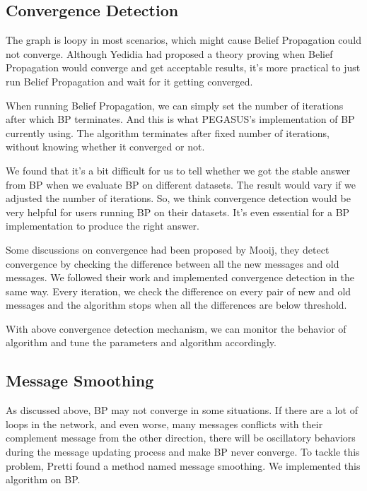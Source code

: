 \subsection{Convergence Detection}

The graph is loopy in most scenarios, which might cause Belief Propagation could not converge. Although Yedidia had proposed a theory proving when Belief Propagation would converge and get acceptable results, it’s more practical to just run Belief Propagation and wait for it getting converged.

When running Belief Propagation, we can simply set the number of iterations after which BP terminates. And this is what PEGASUS’s implementation of BP currently using. The algorithm terminates after fixed number of iterations, without knowing whether it converged or not.

We found that it’s a bit difficult for us to tell whether we got the stable answer from BP when we evaluate BP on different datasets. The result would vary if we adjusted the number of iterations. So, we think convergence detection would be very helpful for users running BP on their datasets. It’s even essential for a BP implementation to produce the right answer.

Some discussions on convergence had been proposed by Mooij\cite{Mooij05}, they detect convergence by checking the difference between all the new messages and old messages. We followed their work and implemented convergence detection in the same way. Every iteration, we check the difference on every pair of new and old messages and the algorithm stops when all the differences are below threshold.

With above convergence detection mechanism, we can monitor the behavior of algorithm and tune the parameters and algorithm accordingly.

\subsection{Message Smoothing}

As discussed above, BP may not converge in some situations. If there are a lot of loops in the network, and even worse, many messages conflicts with their complement message from the other direction, there will be oscillatory behaviors during the message updating process and make BP never converge. To tackle this problem, Pretti\cite{Pretti} found a method named message smoothing. We implemented this algorithm on BP.

